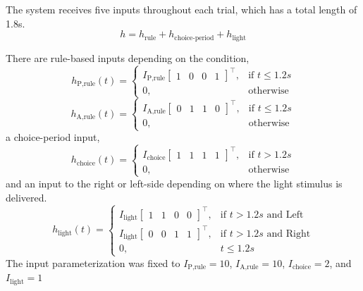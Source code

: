 \documentclass[11pt]{article}
\begin{document}
The system receives five inputs throughout each trial, which has a total length of 1.8s.
\begin{equation}
h = h_{\text{rule}} + h_{\text{choice-period}} + h_{\text{light}}
\end{equation}

There are rule-based inputs depending on the condition,
\begin{equation}h_{\text{P,rule}}(t) = \begin{cases}
                           I_{\text{P,rule}} \begin{bmatrix} 1 & 0 & 0 & 1 \end{bmatrix}^\top,& \text{if } t\leq 1.2s \\
                            0,              & \text{otherwise}
                         \end{cases}
\end{equation}
\begin{equation} h_{\text{A,rule}}(t) = \begin{cases}
                           I_{\text{A,rule}} \begin{bmatrix} 0 & 1 & 1 & 0 \end{bmatrix}^\top,& \text{if } t\leq 1.2s \\
                            0,              & \text{otherwise}
                         \end{cases}
\end{equation}
a choice-period input,
\begin{equation} h_{\text{choice}}(t) = \begin{cases}
                           I_{\text{choice}} \begin{bmatrix} 1 & 1 & 1 & 1 \end{bmatrix}^\top,& \text{if } t > 1.2s \\
                            0,              & \text{otherwise}
                         \end{cases}
\end{equation}
and an input to the right or left-side depending on where the light stimulus is delivered.     
\begin{equation}  h_{\text{light}}(t) = \begin{cases}
                           I_{\text{light}} \begin{bmatrix} 1 & 1 & 0 & 0 \end{bmatrix}^\top,& \text{if } t > 1.2s \text{ and Left} \\
                           I_{\text{light}} \begin{bmatrix} 0 & 0 & 1 & 1 \end{bmatrix}^\top,& \text{if } t > 1.2s \text{ and Right} \\
                            0,              & t \leq 1.2s
                         \end{cases} 
\end{equation}
The input parameterization was fixed to $I_{\text{P,rule}} = 10 $,  $I_{\text{A,rule}} = 10$,  $I_{\text{choice}} = 2$,  and $I_{\text{light}} = 1$
\end{document}
